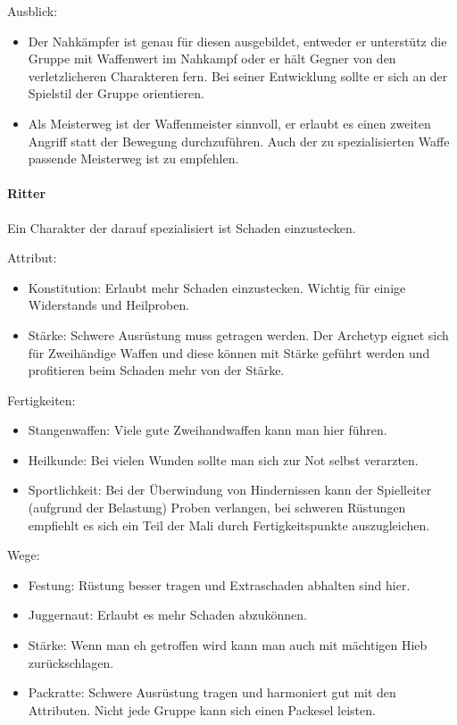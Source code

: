 \documentclass{article}
\begin{document}
Ausblick:
\begin{itemize}
\item Der Nahkämpfer ist genau für diesen ausgebildet, entweder er unterstütz die Gruppe mit Waffenwert im Nahkampf oder er hält Gegner von den verletzlicheren Charakteren fern. Bei seiner Entwicklung sollte er sich an der Spielstil der Gruppe orientieren.
\item Als Meisterweg ist der Waffenmeister sinnvoll, er erlaubt es einen zweiten Angriff statt der Bewegung durchzuführen. Auch der zu spezialisierten Waffe passende Meisterweg ist zu empfehlen.
\end{itemize}

\paragraph{Ritter}
Ein Charakter der darauf spezialisiert ist Schaden einzustecken.

Attribut:
\begin{itemize}
\item Konstitution: Erlaubt mehr Schaden einzustecken. Wichtig für einige Widerstands und Heilproben.
\item Stärke: Schwere Ausrüstung muss getragen werden. Der Archetyp eignet sich für Zweihändige Waffen und diese können mit Stärke geführt werden und profitieren beim Schaden mehr von der Stärke.
\end{itemize}

Fertigkeiten:
\begin{itemize}
\item Stangenwaffen: Viele gute Zweihandwaffen kann man hier führen.
\item Heilkunde: Bei vielen Wunden sollte man sich zur Not selbst verarzten.
\item Sportlichkeit: Bei der Überwindung von Hindernissen kann der Spielleiter (aufgrund der Belastung) Proben verlangen, bei schweren Rüstungen empfiehlt es sich ein Teil der Mali durch Fertigkeitspunkte auszugleichen.
\end{itemize}

Wege:
\begin{itemize}
\item Festung: Rüstung besser tragen und Extraschaden abhalten sind hier.
\item Juggernaut: Erlaubt es mehr Schaden abzukönnen.
\item Stärke: Wenn man eh getroffen wird kann man auch mit mächtigen Hieb zurückschlagen.
\item Packratte: Schwere Ausrüstung tragen und harmoniert gut mit den Attributen. Nicht jede Gruppe kann sich einen Packesel leisten.
\end{itemize}
\end{document}
